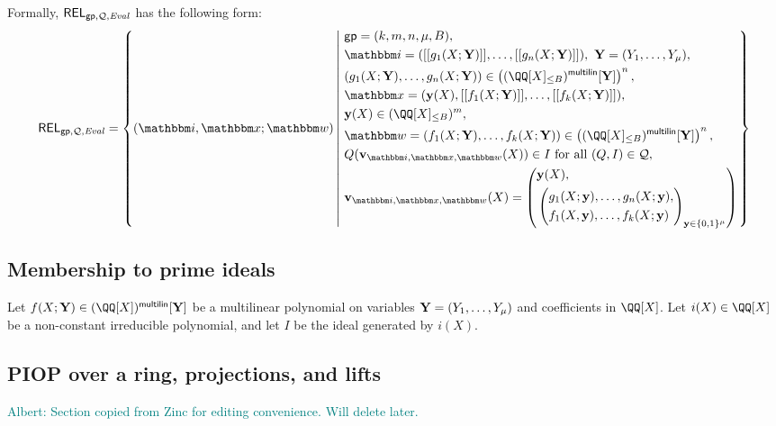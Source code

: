 \documentclass[11pt,letterpaper,usenames,dvipsnames]{article}
\newcommand{\albert}[1]{\textcolor{teal}{Albert: {#1}}}
\begin{document}
    Formally, $\mathsf{REL}_{\mathsf{gp},\mathcal{Q},\text{\emph{Eval}}}$ has the following form:
    \begin{equation*}
    \begin{aligned}
    \REL_{\gparams,\cQ,\evalconstraints} = \left\{ (\idx, \inp ; \wit) \left| \ \begin{aligned}
    & \gparams=(k,m,n,\mu, B),  \\
    & \idx = ( \oracle{g_1(X;\YY)},\ldots, \oracle{g_n(X;\YY)}), \ \YY=(Y_1,\ldots, Y_\mu), \\
            &(g_1(X;\YY),\dots,g_n(X;\YY))\in \left(\mainQpolyringmultilin[\YY]\right)^{n},\\
    & \inp =(\yy(X), \oracle{f_1(X;\YY)}, \ldots, \oracle{f_k(X;\YY)}),\\ &\yy(X)\in \mainQpolyring^{m},\\    
        &\wit = (f_1(X;\YY), \ldots, f_k(X;\YY)) \in \left(\mainQpolyringmultilin[\YY]\right)^{n},\\
        &Q(\vv_{\idx, \inp,\wit}(X)) \in I  \text{ for all } (Q,I)\in \cQ,\\
        &\vv_{\idx, \inp,\wit}(X) = \left(\begin{aligned}&\yy(X),\\ &\left(\begin{aligned}&g_1(X;\yy),\ldots, g_n(X;\yy),\\ &f_1(X,\yy),\ldots, f_k(X;\yy)\end{aligned}\right)_{\yy\in \BB^\mu}\end{aligned}\right)
    \end{aligned} \right.\right\}
    \end{aligned}
    \end{equation*}

    \subsection{Membership to prime ideals}

    \begin{lemma}
    Let $f(X;\YY) \in (\QQ[X])^{\multilin}[\YY]$ be a multilinear polynomial on variables $\mathbf{Y}= (Y_1,\ldots, Y_\mu)$ and coefficients in $\QQ[X]$. Let $i(X) \in \QQ[X]$ be a non-constant irreducible polynomial, and let $I$ be the ideal generated by $i(X)$. 
    \end{lemma}

    \subsection{PIOP over a ring, projections, and lifts}
\albert{Section copied from Zinc for editing convenience. Will delete later.}
\end{document}
